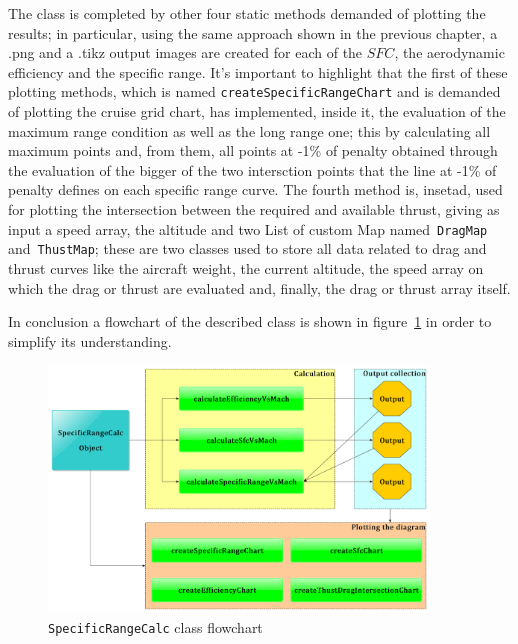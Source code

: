 \bigskip
\noindent
The class is completed by other four static methods demanded of plotting the results; in particular, using the same approach shown in the previous chapter, a .png and a .tikz output images are created for each of the $SFC$, the aerodynamic efficiency and the specific range.
%
It's important to highlight that the first of these plotting methods, which is named \lstinline[language=Java]!createSpecificRangeChart! and is demanded of plotting the cruise grid chart, has implemented, inside it, the evaluation of the maximum range condition as well as the long range one; this by calculating all maximum points and, from them, all points at -1\% of penalty obtained through the evaluation of the bigger of the two intersction points that the line at -1\% of penalty defines on each specific range curve.
%
\noindent
The fourth method is, insetad, used for plotting the intersection between the required and available thrust, giving as input a speed array, the altitude and two \gls{List} of custom \gls{Map} named~\lstinline[language=Java]!DragMap! and~\lstinline[language=Java]!ThustMap!; these are two classes used to store all data related to drag and thrust curves like the aircraft weight, the current altitude, the speed array on which the drag or thrust are evaluated and, finally, the drag or thrust array itself.  

\bigskip
\noindent
In conclusion a flowchart of the described class is shown in figure~\ref{fig:Figure7} in order to simplify its understanding.
%
\begin{figure}[t]
\centering
\includegraphics[keepaspectratio, width=0.90\textwidth]{SpecificRange_Flowchart}
\caption{\lstinline[language=Java]!SpecificRangeCalc! class flowchart}
\label{fig:Figure7}
\end{figure}
%
